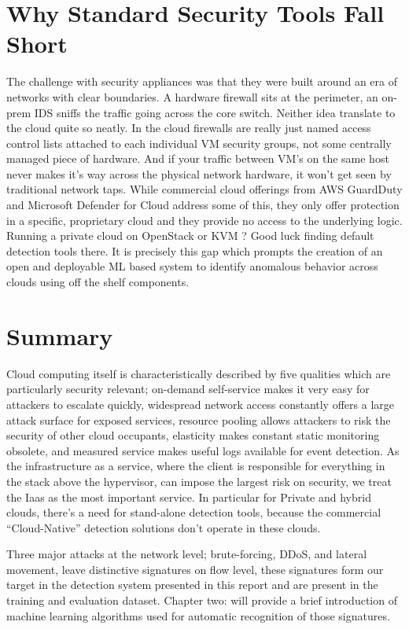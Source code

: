 \section{Why Standard Security Tools Fall Short}
\label{sec:cloud_tools_limits}

The challenge with security appliances was that they were built around an era of networks with clear boundaries. A hardware firewall sits at the perimeter, an on-prem IDS sniffs the traffic going across the core switch. Neither idea translate to the cloud quite so neatly. 
In the cloud firewalls are really just named access control lists attached to each individual VM  security groups, not some centrally managed piece of hardware. 
And if your traffic between VM’s on the same host never makes it’s way across the physical network hardware, it won’t get seen by traditional network taps. While commercial cloud offerings from AWS GuardDuty and Microsoft Defender for Cloud address some of this, they only offer protection in a specific, proprietary cloud and they provide no access to the underlying logic. 
Running a private cloud on OpenStack or KVM ?
Good luck finding default detection tools there. 
It is precisely this gap which prompts the creation of an open and deployable ML based system to identify anomalous behavior across clouds using off the shelf components.

\section{Summary}
\label{sec:cloud_summary}

Cloud computing itself is characteristically described by five qualities which are particularly security relevant; on-demand self-service makes it very easy for attackers to escalate quickly, widespread network access constantly offers a large attack surface for exposed services, resource pooling allows attackers to risk the security of other cloud occupants, elasticity makes constant static monitoring obsolete, and measured service makes useful logs available for event detection. As the infrastructure as a service, where the client is responsible for everything in the stack above the hypervisor, can impose the largest risk on security, we treat the Iaas as the most important service. In particular for Private and hybrid clouds, there’s a need for stand-alone detection tools, because the commercial “Cloud-Native” detection solutions don’t operate in these clouds. 

Three major attacks at the network level; brute-forcing, DDoS, and lateral movement, leave distinctive signatures on flow level, these signatures form our target in the detection system presented in this report and are present in the training and evaluation dataset. 
Chapter two: will provide a brief introduction of machine learning algorithms used for automatic recognition of those signatures.
